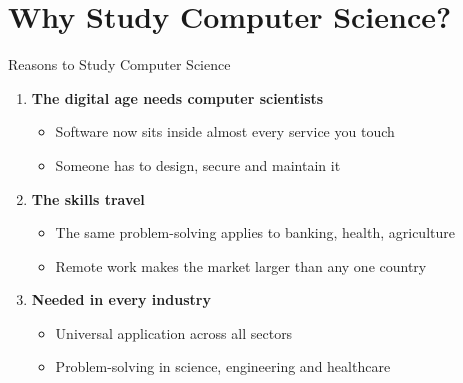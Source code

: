 \documentclass[aspectratio=169]{beamer}
\begin{document}
\section{Why Study Computer Science?}

\begin{frame}{Reasons to Study Computer Science}
  \begin{enumerate}[<+->]
    \item \textbf{The digital age needs computer scientists}
      \begin{itemize}
        \item Software now sits inside almost every service you touch
        \item Someone has to design, secure and maintain it
      \end{itemize}
      \vspace{0.2cm}
    \item \textbf{The skills travel}
      \begin{itemize}
        \item The same problem-solving applies to banking, health, agriculture
        \item Remote work makes the market larger than any one country
      \end{itemize}
      \vspace{0.2cm}
    \item \textbf{Needed in every industry}
      \begin{itemize}
        \item Universal application across all sectors
        \item Problem-solving in science, engineering and healthcare
      \end{itemize}
  \end{enumerate}
\end{frame}
\end{document}
